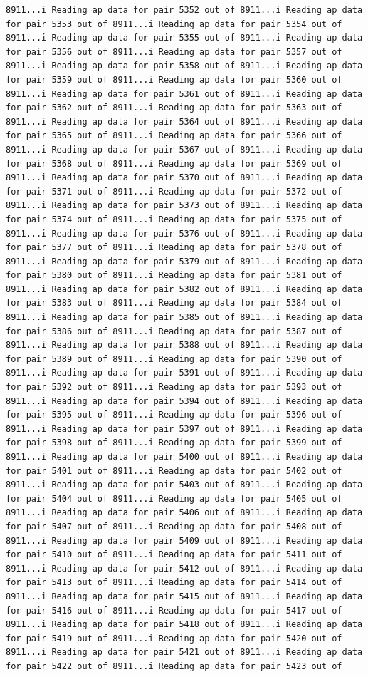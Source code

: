 \documentclass[
]{article}
\begin{document}
\begin{verbatim}
8911...i Reading ap data for pair 5352 out of 8911...i Reading ap data for pair 5353 out of 8911...i Reading ap data for pair 5354 out of 8911...i Reading ap data for pair 5355 out of 8911...i Reading ap data for pair 5356 out of 8911...i Reading ap data for pair 5357 out of 8911...i Reading ap data for pair 5358 out of 8911...i Reading ap data for pair 5359 out of 8911...i Reading ap data for pair 5360 out of 8911...i Reading ap data for pair 5361 out of 8911...i Reading ap data for pair 5362 out of 8911...i Reading ap data for pair 5363 out of 8911...i Reading ap data for pair 5364 out of 8911...i Reading ap data for pair 5365 out of 8911...i Reading ap data for pair 5366 out of 8911...i Reading ap data for pair 5367 out of 8911...i Reading ap data for pair 5368 out of 8911...i Reading ap data for pair 5369 out of 8911...i Reading ap data for pair 5370 out of 8911...i Reading ap data for pair 5371 out of 8911...i Reading ap data for pair 5372 out of 8911...i Reading ap data for pair 5373 out of 8911...i Reading ap data for pair 5374 out of 8911...i Reading ap data for pair 5375 out of 8911...i Reading ap data for pair 5376 out of 8911...i Reading ap data for pair 5377 out of 8911...i Reading ap data for pair 5378 out of 8911...i Reading ap data for pair 5379 out of 8911...i Reading ap data for pair 5380 out of 8911...i Reading ap data for pair 5381 out of 8911...i Reading ap data for pair 5382 out of 8911...i Reading ap data for pair 5383 out of 8911...i Reading ap data for pair 5384 out of 8911...i Reading ap data for pair 5385 out of 8911...i Reading ap data for pair 5386 out of 8911...i Reading ap data for pair 5387 out of 8911...i Reading ap data for pair 5388 out of 8911...i Reading ap data for pair 5389 out of 8911...i Reading ap data for pair 5390 out of 8911...i Reading ap data for pair 5391 out of 8911...i Reading ap data for pair 5392 out of 8911...i Reading ap data for pair 5393 out of 8911...i Reading ap data for pair 5394 out of 8911...i Reading ap data for pair 5395 out of 8911...i Reading ap data for pair 5396 out of 8911...i Reading ap data for pair 5397 out of 8911...i Reading ap data for pair 5398 out of 8911...i Reading ap data for pair 5399 out of 8911...i Reading ap data for pair 5400 out of 8911...i Reading ap data for pair 5401 out of 8911...i Reading ap data for pair 5402 out of 8911...i Reading ap data for pair 5403 out of 8911...i Reading ap data for pair 5404 out of 8911...i Reading ap data for pair 5405 out of 8911...i Reading ap data for pair 5406 out of 8911...i Reading ap data for pair 5407 out of 8911...i Reading ap data for pair 5408 out of 8911...i Reading ap data for pair 5409 out of 8911...i Reading ap data for pair 5410 out of 8911...i Reading ap data for pair 5411 out of 8911...i Reading ap data for pair 5412 out of 8911...i Reading ap data for pair 5413 out of 8911...i Reading ap data for pair 5414 out of 8911...i Reading ap data for pair 5415 out of 8911...i Reading ap data for pair 5416 out of 8911...i Reading ap data for pair 5417 out of 8911...i Reading ap data for pair 5418 out of 8911...i Reading ap data for pair 5419 out of 8911...i Reading ap data for pair 5420 out of 8911...i Reading ap data for pair 5421 out of 8911...i Reading ap data for pair 5422 out of 8911...i Reading ap data for pair 5423 out of 
\end{verbatim}
\end{document}
